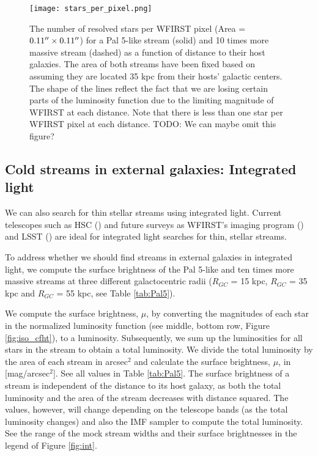 \documentclass[twocolumn]{aastex62}
\newcommand{\todo}[1]{{\color{red} TODO: #1}}
\begin{document}
\begin{figure}
\centerline{\texttt{[image: stars\_per\_pixel.png]}}
\caption{ The number of resolved stars per WFIRST pixel (Area = $0.11\mbox{$^{\prime\prime}$} \times 0.11\mbox{$^{\prime\prime}$}$) for a Pal 5-like stream (solid) and 10 times more massive stream (dashed) as a function of distance to their host galaxies. The area of both streams have been fixed based on assuming they are located 35 kpc from their hosts' galactic centers. The shape of the lines reflect the fact that we are losing certain parts of the luminosity function due to the limiting magnitude of WFIRST at each distance. Note that there is less than one star per WFIRST pixel at each distance. \todo{We can maybe omit this figure?}}
\label{fig:dens}
\end{figure}






\subsection{Cold streams in external galaxies: Integrated light}
\label{sec:integrated}
We can also search for thin stellar streams using integrated light. Current telescopes such as HSC (\citealt{miyazaki12}) and future surveys as WFIRST's imaging program (\citealt{spergel13}) and LSST  (\citealt{ivezi08}) are ideal for integrated light searches for thin, stellar streams. 

To address whether we should find streams in external galaxies in integrated light, we compute the surface brightness of the Pal 5-like and ten times more massive streams at three different galactocentric radii ($R_{GC}$ = 15  kpc, $R_{GC}$ = 35 kpc and $R_{GC}$ = 55 kpc, see Table \ref{tab:Pal5}). 

We compute the surface brightness, $\mu$, by converting the magnitudes of each star in the normalized luminosity function (see middle, bottom row, Figure \ref{fig:iso_cfht}), to a luminosity. Subsequently, we sum up the luminosities for all stars in the stream to obtain a total luminosity. We divide the total luminosity by the area of each stream in arcsec$^2$ and calculate the surface brightness, $\mu$, in [mag/arcsec$^2$]. See all values in Table \ref{tab:Pal5}. The surface brightness of a stream is independent of the distance to its host galaxy, as both the total luminosity and the area of the stream decreases with distance squared. The values, however, will change depending on the telescope bands (as the total luminosity changes) and also the IMF sampler to compute the total luminosity. See the range of the mock stream widths and their surface brightnesses in the legend of Figure \ref{fig:int}. 
\end{document}
